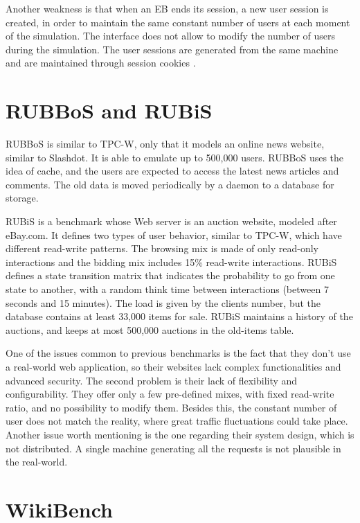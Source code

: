 Another weakness is that when an EB ends its session, a new user session is created, in order to maintain the same constant number of users at each moment of the simulation. The interface does not allow to modify the number of users during the simulation. The user sessions are generated from the same machine and are maintained through session cookies \cite{Cain}.

\section{RUBBoS and RUBiS}
\label{sec:rubbos-rubbis}

RUBBoS \cite{RUBBoS-website} is similar to TPC-W, only that it models an online news website, similar to Slashdot. It is able to emulate up to 500,000 users. RUBBoS uses the idea of cache, and the users are expected to access the latest news articles and comments. The old data is moved periodically by a daemon to a database for storage.

RUBiS \cite{RUBiS-website} is a benchmark whose Web server is an auction website, modeled after eBay.com. It defines two types of user behavior, similar to TPC-W, which have different read-write patterns. The browsing mix is made of only read-only interactions and the bidding mix includes 15\% read-write interactions. RUBiS defines a state transition matrix that indicates the probability to go from one state to another, with a random think time between interactions (between 7 seconds and 15 minutes). The load is given by the clients number, but the database contains at least 33,000 items for sale.  RUBiS maintains a history of the auctions, and keeps at most 500,000 auctions in the old-items table.

One of the issues common to previous benchmarks is the fact that they don't use a real-world web application, so their websites lack complex functionalities and advanced security. The second problem is their lack of flexibility and configurability. They offer only a few pre-defined mixes, with fixed read-write ratio, and no possibility to modify them. Besides this, the constant number of user does not match the reality, where great traffic fluctuations could take place. Another issue worth mentioning is the one regarding their system design, which is not distributed. A single machine generating all the requests is not plausible in the real-world.

\section{WikiBench}
\label{sec:wikibench}


